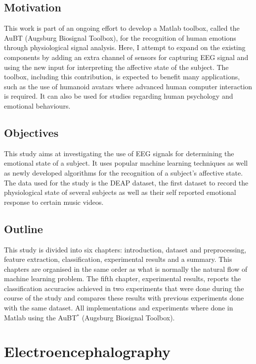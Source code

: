 \documentclass[12pt, a4paper, fleqn]{memoir}%
\begin{document}
\section{Motivation}
\label{sec:Motivation}
This work is part of an ongoing effort to develop a Matlab toolbox, called the AuBT (Augsburg Biosignal Toolbox), for the recognition of human emotions through physiological signal analysis. Here, I attempt to expand on the existing components by adding an extra channel of sensors for capturing EEG signal and using the new input for interpreting the affective state of the subject. The toolbox, including this contribution, is expected to benefit many applications, such as the use of humanoid avatars where advanced human computer interaction is required. It can also be used for studies regarding human psychology and emotional behaviours.
\section{Objectives}
\label{sec:Objectives}
This study aims at investigating the use of EEG signals for determining the emotional state of a subject. It uses popular machine learning techniques as well as newly developed algorithms for the recognition of a subject's affective state. The data used for the study is the DEAP dataset, the first dataset to record the physiological state of several subjects as well as their self reported emotional response to certain music videos. 
\section{Outline}
\label{sec:Outline}
This study is divided into six chapters: introduction, dataset and preprocessing, feature extraction, classification, experimental results and a summary. This chapters are organised in the same order as what is normally the natural flow of machine learning problem. The fifth chapter, experimental results, reports the classification accuracies achieved in two experiments that were done during the course of the study and compares these results with previous experiments done with the same dataset. All implementations and experiments where done in Matlab using the AuBT$^{*}$ (Augsburg Biosignal Toolbox).

\chapter{Electroencephalography}
\label{chap:Electroencephalography}
\end{document}
